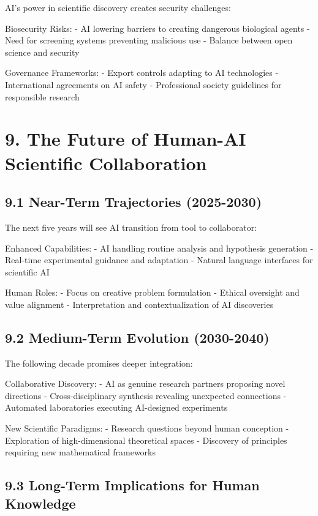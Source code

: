 \documentclass{article}
\begin{document}
AI's power in scientific discovery creates security challenges:


Biosecurity Risks:
- AI lowering barriers to creating dangerous biological agents
- Need for screening systems preventing malicious use
- Balance between open science and security


Governance Frameworks:
- Export controls adapting to AI technologies
- International agreements on AI safety
- Professional society guidelines for responsible research


\section{9. The Future of Human-AI Scientific Collaboration}

\subsection{9.1 Near-Term Trajectories (2025-2030)}

The next five years will see AI transition from tool to collaborator:


Enhanced Capabilities:
- AI handling routine analysis and hypothesis generation
- Real-time experimental guidance and adaptation
- Natural language interfaces for scientific AI


Human Roles:
- Focus on creative problem formulation
- Ethical oversight and value alignment
- Interpretation and contextualization of AI discoveries


\subsection{9.2 Medium-Term Evolution (2030-2040)}

The following decade promises deeper integration:


Collaborative Discovery:
- AI as genuine research partners proposing novel directions
- Cross-disciplinary synthesis revealing unexpected connections
- Automated laboratories executing AI-designed experiments


New Scientific Paradigms:
- Research questions beyond human conception
- Exploration of high-dimensional theoretical spaces
- Discovery of principles requiring new mathematical frameworks


\subsection{9.3 Long-Term Implications for Human Knowledge}
\end{document}
